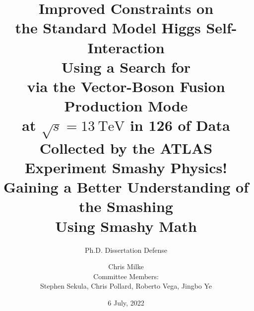 \documentclass{beamer}
\begin{document}
\title{
    Improved Constraints on \\the Standard Model Higgs Self-Interaction \\
    Using a Search for \hhbbbb \\via the Vector-Boson Fusion Production Mode \\
    at $\sqrt{s}=13~\mathrm{TeV}$ in 126 \ifb of Data \\Collected by the ATLAS Experiment
}
\subtitle{\vspace{3mm}Ph.D. Dissertation Defense}

\author{Chris Milke\\{\small Committee Members:\\Stephen Sekula, Chris Pollard, Roberto Vega, Jingbo Ye}}
\date{6 July, 2022}

\frame{\titlepage}
\title{
    Smashy Physics!\\Gaining a Better Understanding of the Smashing\\Using Smashy Math
}
\frame{\titlepage}






%
%
%
%
%
\end{document}
